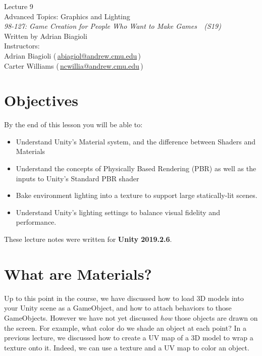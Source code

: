 \documentclass[11pt]{article}
\makeatletter
\newcommand{\lecturenum}{9}
\newcommand{\lecturename}{Advanced Topics: Graphics and Lighting}
\newcommand{\authorname}{Adrian Biagioli}
\newcommand{\coursenum}{98-127}
\newcommand{\coursename}{Game Creation for People Who Want to Make Games}
\newcommand{\coursesem}{S19}
\newcommand{\instructors}{Adrian Biagioli (\,\href{mailto:abiagiol@andrew.cmu.edu}{abiagiol@andrew.cmu.edu}\,) \\ Carter Williams (\,\href{mailto:ncwillia@andrew.cmu.edu}{ncwillia@andrew.cmu.edu}\,)}
\makeatother
\begin{document}
\thispagestyle{plain}
{
    \vspace{1.5em}
    \begin{center}
    {
        \huge
        Lecture \lecturenum \\
        \vspace{0.5em}
        \lecturename
        \vspace{0.4em}
    } \\
    {
        \it
        \coursenum: \coursename\ \ (\coursesem)
    } \\
    \vspace{1.0em}
    Written by \authorname \\
    \vspace{0.7em}
    Instructors:\\ \instructors
    \end{center}
}

\section{Objectives}

By the end of this lesson you will be able to:
\begin{itemize}
    \item Understand Unity's Material system, and the difference between Shaders and Materials
    \item Understand the concepts of Physically Based Rendering (PBR) as well as the inputs to Unity's Standard PBR shader
    \item Bake environment lighting into a texture to support large statically-lit scenes.
    \item Understand Unity's lighting settings to balance visual fidelity and performance.
\end{itemize}

\noindent These lecture notes were written for {\bf Unity 2019.2.6}.

\section{What are Materials?}

Up to this point in the course, we have discussed how to load 3D models into your Unity scene as a GameObject, and how to attach behaviors to those GameObjects.  However we have not yet discussed {\it how} those objects are drawn on the screen.  For example, what color do we shade an object at each point?  In a previous lecture, we discussed how to create a UV map of a 3D model to wrap a texture onto it.  Indeed, we can use a texture and a UV map to color an object.  
\end{document}

